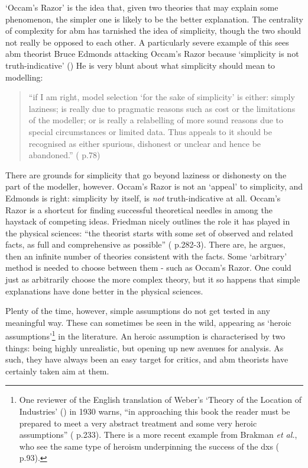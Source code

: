 `Occam's Razor' is the idea that, given two theories that may explain some phenomenon, the simpler one is likely to be the better explanation. The centrality of complexity for \gls{abm} has tarnished the idea of simplicity, though the two should not really be opposed to each other. A particularly severe example of this sees \gls{abm} theorist Bruce Edmonds attacking Occam's Razor because `simplicity is not truth-indicative' (\citealt{gershenson_simplicity_2007}) He is very blunt about what simplicity should mean to modelling:

\begin{quote}
``if I am right, model selection `for the sake of simplicity' is either: simply laziness; is really due to pragmatic reasons such as cost or the limitations of the modeller; or is really a relabelling of more sound reasons due to special circumstances or limited data. Thus appeals to it should be recognised as either spurious, dishonest or unclear and hence be abandoned.'' (\citealt{gershenson_simplicity_2007} p.78)
\end{quote}

There are grounds for simplicity that go beyond laziness or dishonesty on the part of the modeller, however. Occam's Razor is not an `appeal' to simplicity, and Edmonds is right: simplicity by itself, is \emph{not} truth-indicative at all. Occam's Razor is a shortcut for finding successful theoretical needles in among the haystack of competing ideas. Friedman nicely outlines the role it has played in the physical sciences: ``the theorist starts with some set of observed and related facts, as full and comprehensive as possible'' (\citealt{friedman_lange_1953} p.282-3). There are, he argues, then an infinite number of theories consistent with the facts. Some `arbitrary' method is needed to choose between them - such as Occam's Razor. One could just as arbitrarily choose the more complex theory, but it so happens that simple explanations have done better in the physical sciences.

Plenty of the time, however, simple assumptions do not get tested in any meaningful way. These can sometimes be seen in the wild, appearing as `heroic assumptions'\footnote{One reviewer  of the English translation of Weber's `Theory of the Location of Industries' (\citealt{weber_theory_1909}) in 1930 warns, ``in approaching this book the reader must be prepared to meet a very abstract treatment and some very heroic assumptions'' (\citealt{fetter_review:_1930} p.233). There is a more recent example from Brakman \emph{et al.}, who see the same type of heroism underpinning the success of the \gls{dxs} (\citealt{brakman_new_2009} p.93).} in the literature. An heroic assumption is characterised by two things: being highly unrealistic, but opening up new avenues for analysis. As such, they have always been an easy target for critics, and \gls{abm} theorists have certainly taken aim at them.

